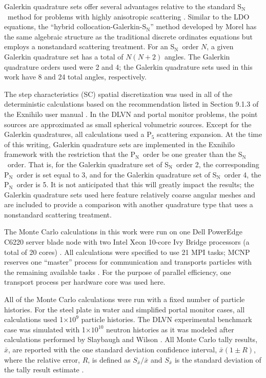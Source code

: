 \documentclass{article} %
\newcommand{\sn}{S$_\mathrm{N}$}
\newcommand{\pn}{P$_\mathrm{N}$}
\newcommand{\xbar}{\ensuremath{\bar{x}}}
\newcommand{\E}[1]{$\times10^{#1}$}
\begin{document}
Galerkin quadrature sets offer several advantages relative to the standard
\sn\ method for problems with highly anisotropic scattering \cite{morel}.
Similar to the LDO equations, the 
``hybrid collocation-Galerkin-S$_\mathrm{N}$'' method developed by Morel 
has the same algebraic structure as the traditional discrete ordinates
equations but employs a nonstandard scattering treatment. For an \sn\ order
$N$, a given Galerkin quadrature set has a total of $N(N+2)$ angles. The
Galerkin quadrature orders used were 2 and 4; the
Galerkin quadrature sets used in this work have 8 and 24 total angles,
respectively.

The step characteristics (SC) spatial discretization was used in all of the
deterministic calculations based on the recommendation listed in Section 9.1.3
of the Exnihilo user manual \cite{exum}. In the DLVN and portal monitor
problems, the point sources are approximated as small spherical volumetric
sources. Except for the Galerkin quadratures, all calculations used a P$_5$
scattering expansion. At the time of this writing, Galerkin quadrature sets
are implemented in the Exnihilo framework with the restriction that the \pn\
order be one greater than the \sn\ order. That is, for the Galerkin quadrature
set of \sn\ order 2, the corresponding \pn\ order is set equal to 3, and for
the Galerkin quadrature set of \sn\ order 4, the \pn\ order is 5. It is not
anticipated that this will greatly impact the results; the Galerkin
quadrature sets used here feature relatively coarse angular meshes and are
included to provide a comparison with another quadrature type that uses a
nonstandard scattering treatment.

The Monte Carlo calculations in this work were run on one Dell PowerEdge C6220
server blade node with two Intel Xeon 10-core Ivy Bridge processors (a total
of 20 cores) \cite{savio}. All calculations were specified to use 21 MPI
tasks; MCNP reserves one ``master'' process for communication and transports
particles with the remaining available tasks \cite{mcnp}. For the purpose of
parallel efficiency, one transport process per hardware core was used here.

All of the Monte Carlo calculations were run with a fixed number of particle
histories. For the steel plate in water and simplified portal
monitor cases, all calculations used 1\E{9} particle histories. The DLVN
experimental benchmark case was simulated with 1\E{10} neutron histories as it
was modeled after calculations performed by Slaybaugh and Wilson
\cite{sw-dlvn}. All Monte Carlo tally results, $\xbar$, are reported with the
one standard deviation confidence interval, $\xbar(1\pm R)$, where the relative
error, $R$, is defined as $S_{\xbar}/\xbar$ and $S_{\xbar}$ is the standard
deviation of the tally result estimate \cite{mcnp}.
\end{document}
